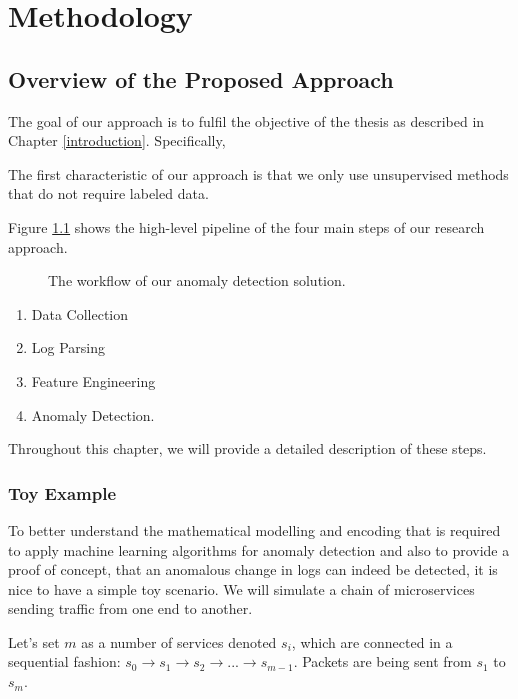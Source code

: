 \chapter{Methodology}
\label{methodology}

\section{Overview of the Proposed Approach}
The goal of our approach is to fulfil the objective of the thesis as described in Chapter \ref{introduction}. Specifically, 

The first characteristic of our approach is that we only use unsupervised methods that do not require labeled data. 

Figure \ref{fig:worklowOverview} shows the high-level pipeline of the four main steps of our research approach.

\begin{figure}[h]
    \centering
    
    \caption{The workflow of our anomaly detection solution.}
    \label{fig:worklowOverview}
\end{figure}

\begin{enumerate}
    \item Data Collection 
    \item Log Parsing
    \item Feature Engineering
    \item Anomaly Detection.
\end{enumerate}

Throughout this chapter, we will provide a detailed description of these steps.

\subsection{Toy Example}
To better understand the mathematical modelling and encoding that is required to apply machine learning algorithms for anomaly detection and also to provide a proof of concept, that an anomalous change in logs can indeed be detected, it is nice to have a simple toy scenario. We will simulate a chain of microservices sending traffic from one end to another.

Let's set $m$ as a number of services denoted $s_i$, which are connected in a sequential fashion: $s_0 \rightarrow s_1 \rightarrow s_2 \rightarrow ... \rightarrow s_{m-1}$. Packets are being sent from $s_1$ to $s_m$.

